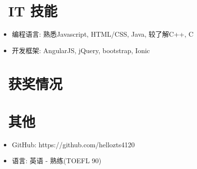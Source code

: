 \documentclass{resume}
\begin{document}

\section{\faCogs\ IT 技能}
\begin{itemize}[parsep=0.5ex]
  \item 编程语言: 熟悉Javascript, HTML/CSS, Java, 较了解C++, C
  \item 开发框架: AngularJS, jQuery, bootstrap, Ionic
\end{itemize}

\section{\faHeartO\ 获奖情况}

\section{\faInfo\ 其他}
\begin{itemize}[parsep=0.5ex]
  \item GitHub: https://github.com/hellozts4120
  \item 语言: 英语 - 熟练(TOEFL 90)
\end{itemize}

%
%
\end{document}
